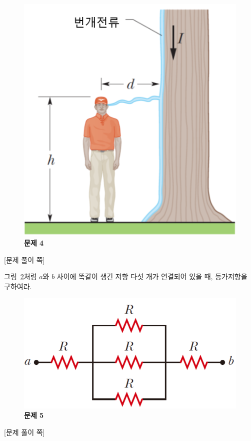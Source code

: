 \documentclass[tightenlines,floatfix,nofootinbib,superscriptaddress,fleqn]{revtex4}
\begin{document}
\begin{figure}[htp]
  \centering
  \includegraphics[scale=0.45]{qfig5-20220914-1.png}
  \caption{\textbf{문제 4}}
  \label{fig:1}
\end{figure}

\newpage
{\color{gray} [문제 풀이 쪽]}
\newpage

그림~\ref{fig:2}처럼 $a$와 $b$ 사이에 똑같이 생긴 저항 다섯 개가
연결되어 있을 때, 등가저항을 구하여라. 
\begin{figure}[htp]
  \centering
  \includegraphics[scale=0.45]{qfig5-20220914-2.pdf}
  \caption{\textbf{문제 5}}
  \label{fig:2}
\end{figure}

\newpage
{\color{gray} [문제 풀이 쪽]}
\newpage
\end{document}
